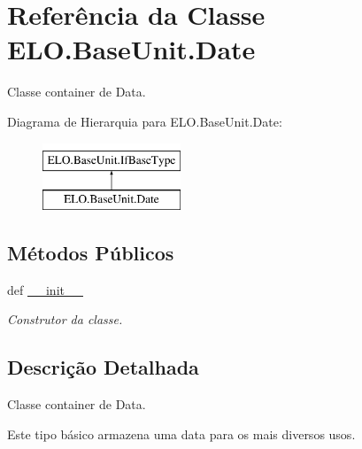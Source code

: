 \hypertarget{classELO_1_1BaseUnit_1_1Date}{\section{Referência da Classe E\-L\-O.\-Base\-Unit.\-Date}
\label{classELO_1_1BaseUnit_1_1Date}
}


Classe container de Data.  


Diagrama de Hierarquia para E\-L\-O.\-Base\-Unit.\-Date\-:\begin{figure}[H]
\begin{center}
\leavevmode
\includegraphics[height=2.000000cm]{d2/d74/classELO_1_1BaseUnit_1_1Date}
\end{center}
\end{figure}
\subsection*{Métodos Públicos}
\begin{DoxyCompactItemize}
\item 
def \hyperlink{classELO_1_1BaseUnit_1_1Date_a97d924fa5f1b2a1d8afbdbfe17b6a852}{\-\_\-\-\_\-init\-\_\-\-\_\-}
\begin{DoxyCompactList}\small\item\em Construtor da classe. \end{DoxyCompactList}\end{DoxyCompactItemize}


\subsection{Descrição Detalhada}
Classe container de Data. 

Este tipo básico armazena uma data para os mais diversos usos. 


